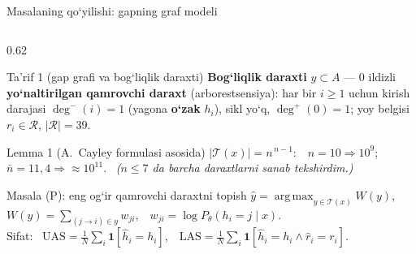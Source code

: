 \documentclass[aspectratio=169,11pt]{beamer}
\newenvironment{tarif}[1][]{\begin{block}{Ta’rif #1}}{\end{block}}
\newenvironment{lemmauz}[1][]{\begin{block}{Lemma #1}}{\end{block}}
\newenvironment{masala}[1][]{\begin{alertblock}{Masala #1}}{\end{alertblock}}
\DeclareMathOperator*{\argmax}{arg\,max}
\newcommand{\ind}{\mathbf{1}}
\begin{document}
\begin{frame}{Masalaning qo‘yilishi: gapning graf modeli}
\begin{columns}[T,onlytextwidth]
\begin{column}{0.62\textwidth}
\begin{tarif}[1 (gap grafi va bog‘liqlik daraxti)]
    \textbf{Bog‘liqlik daraxti} $y\subset A$ --- $0$ ildizli \textbf{yo‘naltirilgan qamrovchi daraxt} (arborestsensiya): har bir $i\ge1$ uchun kirish darajasi $\deg^-(i)=1$ (yagona \textbf{o‘zak} $h_i$), sikl yo‘q, $\deg^+(0)=1$; yoy belgisi $r_i\in\mathcal R$, $|\mathcal R|=39$.
  \end{tarif}
  \begin{lemmauz}[1 (A.~Cayley formulasi asosida)]
    \scriptsize $|\mathcal T(x)|=n^{\,n-1}$:\ \ $n=10\Rightarrow10^{9}$;\ \ $\bar n=11{,}4\Rightarrow\approx10^{11}$. \ {\tiny\itshape ($n\le7$ da barcha daraxtlarni sanab tekshirdim.)}
  \end{lemmauz}
  \begin{masala}[(P): eng og‘ir qamrovchi daraxtni topish]
    \scriptsize $\hat y=\argmax\nolimits_{y\in\mathcal T(x)}W(y)$,\ \ $W(y)=\sum\nolimits_{(j\to i)\in y}w_{ji}$,\ \ $w_{ji}=\log P_\theta(h_i=j\mid x)$.\\[1pt]
    Sifat: \ $\mathrm{UAS}=\frac1N\sum_{i}\ind[\hat h_i=h_i]$,\ \ $\mathrm{LAS}=\frac1N\sum_i\ind[\hat h_i=h_i\wedge\hat r_i=r_i]$.
  \end{masala}
\end{column}
\end{columns}
\end{frame}
\end{document}
